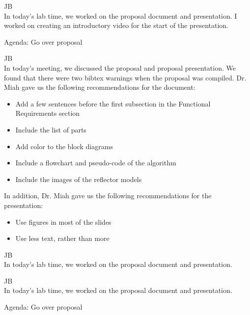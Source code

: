 \documentclass[fontsize=11pt, %
                             paper=letter, %
                             openany, %
                             captions=tableheading,
                             index=totoc,
                             hyperref]{labbook}
\begin{document}
\begin{addmargin}[0cm]{0cm}


JB\\
In today's lab time, we worked on the proposal document and presentation. I worked on creating an introductory video for the start of the presentation.

Agenda: Go over proposal

JB\\
In today's meeting, we discussed the proposal and proposal presentation. We found that there were two bibtex warnings when the proposal was compiled. Dr. Miah gave us the following recommendations for the document:
\begin{itemize}
    \item Add a few sentences before the first subsection in the Functional Requirements section
    \item Include the list of parts
    \item Add color to the block diagrams
    \item Include a flowchart and pseudo-code of the algorithm
    \item Include the images of the reflector models
\end{itemize}

In addition, Dr. Miah gave us the following recommendations for the presentation:
\begin{itemize}
    \item Use figures in most of the slides
    \item Use less text, rather than more
\end{itemize}



JB\\
In today's lab time, we worked on the proposal document and presentation.



JB\\
In today's lab time, we worked on the proposal document and presentation.

Agenda: Go over proposal


\end{addmargin}
\end{document}
